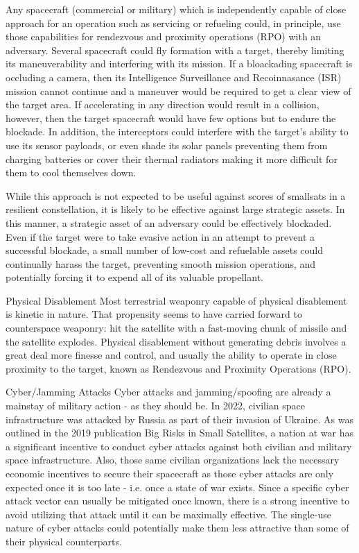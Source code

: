 Any spacecraft (commercial or military) which is independently capable of close approach for an operation such as servicing or refueling could, in principle, use those capabilities for rendezvous and proximity operations (RPO) with an adversary.  Several spacecraft could fly formation with a target, thereby limiting its maneuverability and interfering with its mission.  If a bloackading spacecraft is occluding a camera, then its Intelligence Surveillance and Recoinnasance (ISR) mission cannot continue and a maneuver would be required to get a clear view of the target area.  If accelerating in any direction would result in a collision, however, then the target spacecraft would have few options but to endure the blockade.  In addition, the interceptors could interfere with the target's ability to use its sensor payloads, or even shade its solar panels preventing them from charging batteries or cover their thermal radiators making it more difficult for them to cool themselves down.

While this approach is not expected to be useful against scores of smallsats in a resilient constellation, it is likely to be effective against large strategic assets. In this manner, a strategic asset of an adversary could be effectively blockaded.  Even if the target were to take evasive action in an attempt to prevent a successful blockade, a small number of low-cost and refuelable assets could continually harass the target, preventing smooth mission operations, and potentially forcing it to expend all of its valuable propellant.

Physical Disablement
Most terrestrial weaponry capable of physical disablement is kinetic in nature.  That propensity seems to have carried forward to counterspace weaponry: hit the satellite with a fast-moving chunk of missile and the satellite explodes.  Physical disablement without generating debris involves a great deal more finesse and control, and usually the ability to operate in close proximity to the target, known as Rendezvous and Proximity Operations (RPO).

Cyber/Jamming Attacks
Cyber attacks and jamming/spoofing are already a mainstay of military action - as they should be.  In 2022, civilian space infrastructure was attacked by Russia as part of their invasion of Ukraine.  As was outlined in the 2019 publication Big Risks in Small Satellites, a nation at war has a significant incentive to conduct cyber attacks against both civilian and military space infrastructure.  Also, those same civilian organizations lack the necessary economic incentives to secure their spacecraft as those cyber attacks are only expected once it is too late - i.e. once a state of war exists.  Since a specific cyber attack vector can usually be mitigated once known, there is a strong incentive to avoid utilizing that attack until it can be maximally effective.  The single-use nature of cyber attacks could potentially make them less attractive than some of their physical counterparts.


